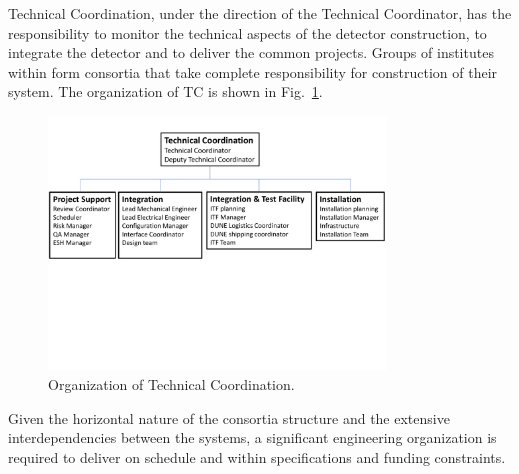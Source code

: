  Technical Coordination, under the direction of the
 Technical Coordinator, has the responsibility to monitor
the technical aspects of the detector construction, to integrate the
detector and to deliver the common projects. Groups of institutes
within  form consortia that take complete responsibility
for construction of their system. The organization of TC is shown in
Fig.~\ref{fig:TC_orgchart}.
\begin{figure}[htb]
  \begin{center}
    \includegraphics[width=0.8\textwidth]{far-detector-generic/figures/TP_TC_Org_Chart}
    \caption{Organization of Technical Coordination.}
    \label{fig:TC_orgchart}
  \end{center}
\end{figure}



Given the horizontal nature of the consortia structure and the
extensive interdependencies between the systems, a significant
engineering organization is required to deliver  on
schedule and within specifications and funding constraints.



